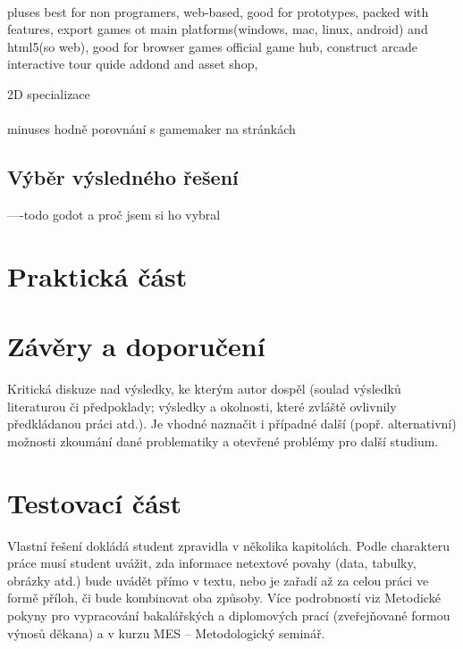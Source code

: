 \paragraph{}
pluses
best for non programers,
web-based,
good for prototypes,
packed with features,
export games ot main platforms(windows, mac, linux, android) and html5(so web),
good for browser games
official game hub, construct arcade
interactive tour quide
addond and asset shop,

2D specializace

\paragraph{}
minuses
hodně porovnání s gamemaker na stránkách





\subsection{Výběr výsledného řešení}
----todo \linebreak godot a proč jsem si ho vybral


\section{Praktická část}



\section{Závěry a doporučení}


Kritická diskuze nad výsledky, ke kterým autor dospěl (soulad výsledků  literaturou či předpoklady;
výsledky a okolnosti, které zvláště ovlivnily předkládanou práci atd.). Je vhodné naznačit i případné další
(popř. alternativní) možnosti zkoumání dané problematiky a otevřené problémy pro další studium.

\section{Testovací část}


Vlastní řešení dokládá student zpravidla v několika kapitolách. Podle charakteru práce musí student uvážit, zda informace
netextové povahy (data, tabulky, obrázky atd.) bude uvádět přímo v textu, nebo je zařadí až za celou práci ve formě příloh, či bude kombinovat oba způsoby.
Více podrobností viz Metodické pokyny pro vypracování bakalářských a diplomových prací (zveřejňované formou výnosů děkana)
a v kurzu MES – Metodologický seminář.

